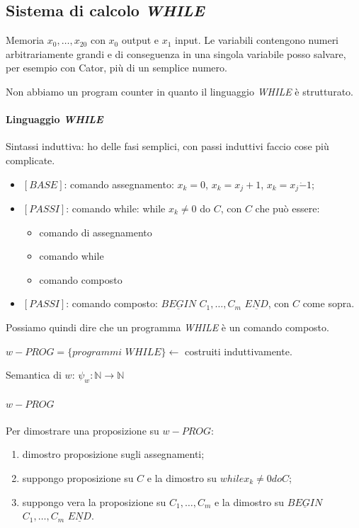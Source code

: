 \documentclass{article}
\begin{document}
\subsection{Sistema di calcolo \textit{WHILE}}
Memoria $x_0, \dots, x_20$ con $x_0$ output e $x_1$ input. Le variabili contengono numeri arbitrariamente grandi e di conseguenza in una singola variabile posso salvare, per esempio con Cator, più di un semplice numero.



Non abbiamo un program counter in quanto il linguaggio \textit{WHILE} è strutturato.

\paragraph{Linguaggio \textit{WHILE}}
Sintassi induttiva: ho delle fasi semplici, con passi induttivi faccio cose più complicate.
\begin{itemize}
	\item $[BASE]$: comando assegnamento: $x_k=0$, $x_k=x_j+1$, $x_k=x_j\dot{-}1$; 
	\item $[PASSI]$: comando while: while $x_k \neq 0$ do $C$, con $C$ che può essere:
		\begin{itemize}
			\item comando di assegnamento
			\item comando while
			\item comando composto
		\end{itemize}
	\item $[PASSI]$: comando composto: $\underline{\textit{BEGIN}}$ $ C_1, \dots, C_m $ $\underline{\textit{END}}$, con $C$ come sopra.
\end{itemize}

Possiamo quindi dire che un programma \textit{WHILE} è un comando composto.


$w-\textit{PROG} = \{ \textit{programmi WHILE} \} \leftarrow$ costruiti induttivamente.


Semantica di $w$: $\psi_w:\mathbb{N}\rightarrow\mathbb{N}$


\paragraph{$w-\textit{PROG}$} Per dimostrare una proposizione su $w-\textit{PROG}$:
\begin{enumerate}
	\item dimostro proposizione sugli assegnamenti;
	\item suppongo proposizione su $C$ e la dimostro su $while x_k \neq 0 do C$;
	\item suppongo vera la proposizione su $C_1, \dots, C_m$ e la dimostro su $\underline{\textit{BEGIN}}$ $ C_1, \dots, C_m$ $ \underline{\textit{END}}$.
\end{enumerate}
\end{document}
